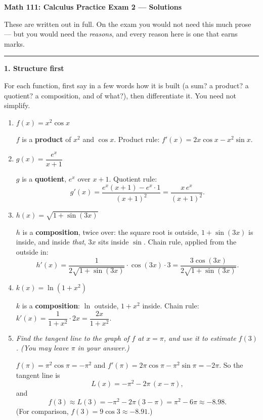 \documentclass[11pt]{article}
\newcommand{\q}[1]{{\color{gray!55!black}\itshape #1}\par\smallskip}
\newenvironment{statement}{\par\color{gray!55!black}}{\par\medskip}
\newcommand{\prob}[1]{\bigskip\noindent\textbf{\large #1}\par\smallskip}
\begin{document}
\begin{center}
{\Large\bfseries Math 111: Calculus \quad Practice Exam 2 --- Solutions}
\end{center}

\medskip
\noindent These are written out in full. On the exam you would not need this much prose ---
but you would need the \emph{reasons}, and every reason here is one that earns marks.

\bigskip\hrule

\prob{1. Structure first}

\begin{statement}
For each function, first say in a few words how it is built (a sum? a product? a quotient? a composition, and of what?), then differentiate it. You need not simplify.
\end{statement}
\begin{enumerate}
\item \q{$f(x) = x^2\cos x$}
$f$ is a \textbf{product} of $x^2$ and $\cos x$. Product rule:
$f'(x) = 2x\cos x - x^2\sin x$.

\item \q{$g(x) = \dfrac{e^x}{x+1}$}
$g$ is a \textbf{quotient}, $e^x$ over $x+1$. Quotient rule:
\[
g'(x) = \frac{e^x(x+1) - e^x\cdot 1}{(x+1)^2} = \frac{x\,e^x}{(x+1)^2}.
\]

\item \q{$h(x) = \sqrt{1+\sin(3x)}$}
$h$ is a \textbf{composition}, twice over: the square root is outside, $1+\sin(3x)$
is inside, and inside \emph{that}, $3x$ sits inside $\sin$. Chain rule, applied from the
outside in:
\[
h'(x) = \frac{1}{2\sqrt{1+\sin(3x)}}\cdot\cos(3x)\cdot 3 = \frac{3\cos(3x)}{2\sqrt{1+\sin(3x)}}.
\]

\item \q{$k(x) = \ln(1+x^2)$}
$k$ is a \textbf{composition}: $\ln$ outside, $1+x^2$ inside. Chain rule:
$k'(x) = \dfrac{1}{1+x^2}\cdot 2x = \dfrac{2x}{1+x^2}$.

\item \q{Find the tangent line to the graph of $f$ at $x=\pi$, and use it to estimate $f(3)$. (You may leave $\pi$ in your answer.)}
$f(\pi) = \pi^2\cos\pi = -\pi^2$ and $f'(\pi) = 2\pi\cos\pi - \pi^2\sin\pi = -2\pi$.
So the tangent line is
\[
L(x) = -\pi^2 - 2\pi\,(x-\pi),
\]
and
\[
f(3)\approx L(3) = -\pi^2 - 2\pi(3-\pi) = \pi^2 - 6\pi \approx -8.98 .
\]
(For comparison, $f(3) = 9\cos 3\approx -8.91$.)
\end{enumerate}
\end{document}
